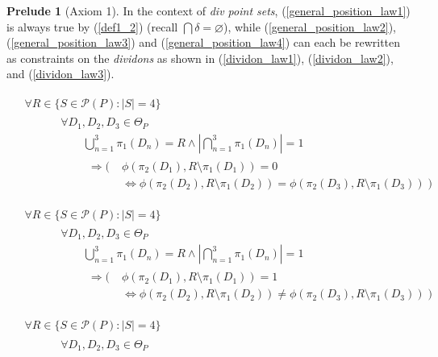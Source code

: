 \documentclass[11pt, oneside]{article}      %
\theoremstyle{definition}
\numberwithin{equation}{section}
\newcommand{\reff}[1]{(\ref{#1})}
\theoremstyle{c}
\newtheorem*{prelude}{Prelude}
\begin{document}
\begin{prelude}[Axiom 1]
In the context of \textit{div point sets},   \reff{general_position_law1} is always true by \reff{def1_2} (recall $ \bigcap \delta = \varnothing$), while \reff{general_position_law2}, \reff{general_position_law3} and \reff{general_position_law4} can each be rewritten as constraints on the \textit{dividons} as shown in \reff{dividon_law1}, \reff{dividon_law2}, and \reff{dividon_law3}.

\begin{align}
\begin{split}
\label{dividon_law1}
&\forall R \in \{ S \in \mathcal{P}(P) : |S| =4 \} \\
&\begin{aligned}\qquad  &\forall D_1, D_2, D_3 \in \Theta_{P} \\
&\qquad \bigcup_{n=1}^{3} \pi_1(D_n) = R \land |\bigcap_{n=1}^{3} \pi_1(D_n)|= 1  \\
&\begin{aligned}\qquad \Rightarrow ( \; &\phi(\pi_2(D_1),R \setminus \pi_1(D_1)) = 0 \\
&\Leftrightarrow \phi(\pi_2(D_2),R  \setminus \pi_1(D_2)) = \phi(\pi_2(D_3),R  \setminus \pi_1(D_3)) \; ) \\
\end{aligned} \end{aligned} \end{split} \\[2.5ex]
\begin{split}\label{dividon_law2}
&\forall R \in \{ S \in \mathcal{P}(P) : |S| =4 \} \\
&\begin{aligned}\qquad  &\forall D_1, D_2, D_3 \in \Theta_{P} \\
&\qquad \bigcup_{n=1}^{3} \pi_1(D_n) = R \land |\bigcap_{n=1}^{3} \pi_1(D_n)|= 1 \\
&\begin{aligned}\qquad \Rightarrow ( \; &\phi(\pi_2(D_1),R \setminus \pi_1(D_1)) = 1 \\
&\Leftrightarrow \phi(\pi_2(D_2),R  \setminus \pi_1(D_2)) \not= \phi(\pi_2(D_3),R  \setminus \pi_1(D_3)) \; ) \\
\end{aligned} \end{aligned} \end{split} \\[2.5ex]
\begin{split}\label{dividon_law3}
&\forall R \in \{ S \in \mathcal{P}(P) : |S| =4 \} \\
&\begin{aligned}\qquad  &\forall D_1, D_2, D_3 \in \Theta_{P} \\

\end{aligned}
\end{split}
\end{align}
\end{prelude}
\end{document}
